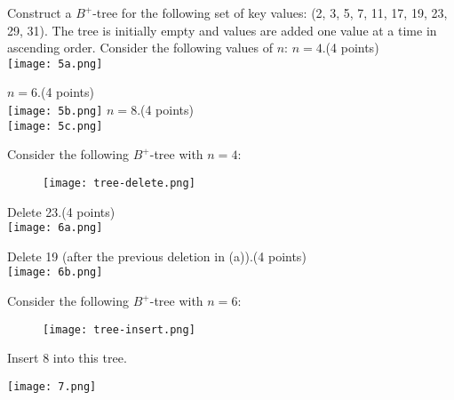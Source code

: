 \documentclass[a4 paper]{article}
\begin{document}
Construct a $B^{+}$-tree for the following set of key values: (2, 3, 5, 7, 11, 17, 19, 23, 29, 31). The tree is initially empty and values are added one value at a time in ascending order. Consider the following values of $n$:
 $n = 4$.\indent \indent (4 points)\\
{\centering \texttt{[image: 5a.png]}}

 $n = 6$.\indent \indent (4 points)\\
{\centering \texttt{[image: 5b.png]}}
 $n = 8$.\indent \indent (4 points)\\
{\centering \texttt{[image: 5c.png]}}



Consider the following $B^{+}$-tree with $n = 4$:
\begin{figure}[h]
\texttt{[image: tree-delete.png]}
\end{figure}

 Delete 23.\indent \indent (4 points)\\
{\centering \texttt{[image: 6a.png]}}

 Delete 19 (after the previous deletion in (a)).\indent \indent (4 points)\\
{\centering \texttt{[image: 6b.png]}}

Consider the following $B^{+}$-tree with $n = 6$:
\begin{figure}[h]
\texttt{[image: tree-insert.png]}
\end{figure}
Insert 8 into this tree.

{\centering \texttt{[image: 7.png]}}
\end{document}
